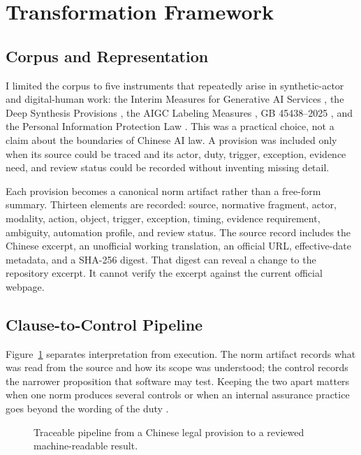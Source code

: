 \documentclass{IOS-Book-Article}
\begin{document}
\section{Transformation Framework}

\subsection{Corpus and Representation}

I limited the corpus to five instruments that repeatedly arise in synthetic-actor and digital-human work: the Interim Measures for Generative AI Services \cite{genaiMeasures2023}, the Deep Synthesis Provisions \cite{deepSynthesisProvisions2022}, the AIGC Labeling Measures \cite{aigcLabelingMeasures2025}, GB 45438--2025 \cite{gb45438}, and the Personal Information Protection Law \cite{pipl2021}. This was a practical choice, not a claim about the boundaries of Chinese AI law. A provision was included only when its source could be traced and its actor, duty, trigger, exception, evidence need, and review status could be recorded without inventing missing detail.

Each provision becomes a canonical norm artifact rather than a free-form summary. Thirteen elements are recorded: source, normative fragment, actor, modality, action, object, trigger, exception, timing, evidence requirement, ambiguity, automation profile, and review status. The source record includes the Chinese excerpt, an unofficial working translation, an official URL, effective-date metadata, and a SHA-256 digest. That digest can reveal a change to the repository excerpt. It cannot verify the excerpt against the current official webpage.

\subsection{Clause-to-Control Pipeline}

Figure~\ref{fig:pipeline} separates interpretation from execution. The norm artifact records what was read from the source and how its scope was understood; the control records the narrower proposition that software may test. Keeping the two apart matters when one norm produces several controls or when an internal assurance practice goes beyond the wording of the duty \cite{witt2024encoding}.

\begin{figure}[t]
\centering
\resizebox{0.92\textwidth}{!}{}
\caption{Traceable pipeline from a Chinese legal provision to a reviewed machine-readable result.}
\label{fig:pipeline}
\end{figure}
\end{document}
